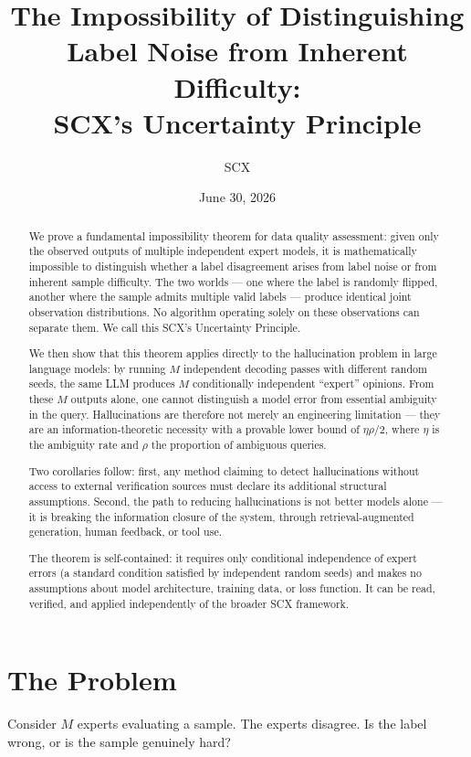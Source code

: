 \documentclass[12pt,a4paper]{article}
\title{The Impossibility of Distinguishing Label Noise from Inherent Difficulty:\\SCX's Uncertainty Principle}
\author{SCX}
\date{June 30, 2026}
\theoremstyle{definition}
\theoremstyle{remark}
\begin{document}
\maketitle

\begin{abstract}
We prove a fundamental impossibility theorem for data quality assessment: given only the observed outputs of multiple independent expert models, it is mathematically impossible to distinguish whether a label disagreement arises from label noise or from inherent sample difficulty. The two worlds — one where the label is randomly flipped, another where the sample admits multiple valid labels — produce identical joint observation distributions. No algorithm operating solely on these observations can separate them. We call this SCX's Uncertainty Principle.

We then show that this theorem applies directly to the hallucination problem in large language models: by running $M$ independent decoding passes with different random seeds, the same LLM produces $M$ conditionally independent ``expert'' opinions. From these $M$ outputs alone, one cannot distinguish a model error from essential ambiguity in the query. Hallucinations are therefore not merely an engineering limitation — they are an information-theoretic necessity with a provable lower bound of $\eta\rho/2$, where $\eta$ is the ambiguity rate and $\rho$ the proportion of ambiguous queries.

Two corollaries follow: first, any method claiming to detect hallucinations without access to external verification sources must declare its additional structural assumptions. Second, the path to reducing hallucinations is not better models alone — it is breaking the information closure of the system, through retrieval-augmented generation, human feedback, or tool use.

The theorem is self-contained: it requires only conditional independence of expert errors (a standard condition satisfied by independent random seeds) and makes no assumptions about model architecture, training data, or loss function. It can be read, verified, and applied independently of the broader SCX framework.
\end{abstract}

\section{The Problem}

Consider $M$ experts evaluating a sample. The experts disagree. Is the label wrong, or is the sample genuinely hard?
\end{document}
